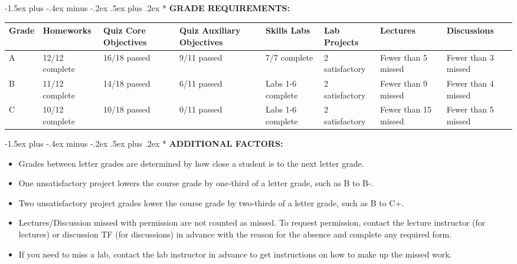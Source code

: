 \documentclass[11pt]{article}
\makeatletter
\renewcommand\section{\@startsection{section}{1}{0pt}%
  {-1.5ex plus -.4ex minus -.2ex}%
  {.5ex plus .2ex}%
  {\normalfont\Large\bfseries}}
\makeatother
\begin{document}
\section*{}
\textbf{GRADE REQUIREMENTS:}

\begin{center}
\scriptsize
\setlength{\tabcolsep}{4pt}
\begin{tabularx}{\textwidth}{lYYYYYYY}
\toprule
\textbf{Grade} & \textbf{Homeworks} & \textbf{Quiz Core Objectives} & \textbf{Quiz Auxiliary Objectives} & \textbf{Skills Labs} & \textbf{Lab Projects} & \textbf{Lectures} & \textbf{Discussions} \\
\midrule
A & 12/12 complete & 16/18 passed & 9/11 passed & 7/7 complete & 2 satisfactory & Fewer than 5 missed & Fewer than 3 missed \\
B & 11/12 complete & 14/18 passed & 6/11 passed & Labs 1-6 complete & 2 satisfactory & Fewer than 9 missed & Fewer than 4 missed \\
C & 10/12 complete & 10/18 passed & 0/11 passed & Labs 1-6 complete & 2 satisfactory & Fewer than 15 missed & Fewer than 5 missed \\
\bottomrule
\end{tabularx}
\end{center}

\section*{}
\textbf{ADDITIONAL FACTORS:}

\begin{samepage}
\begin{itemize}
\item Grades between letter grades are determined by how close a student is to the next letter grade.
\item One unsatisfactory project lowers the course grade by one-third of a letter grade, such as B to B-.
\item Two unsatisfactory project grades lower the course grade by two-thirds of a letter grade, such as B to C+.
\item Lectures/Discussion missed with permission are not counted as missed. To request permission, contact the lecture instructor (for lectures) or discussion TF (for discussions) in advance with the reason for the absence and complete any required form.
\item If you need to miss a lab, contact the lab instructor in advance to get instructions on how to make up the missed work.
\end{itemize}
\end{samepage}
\end{document}
